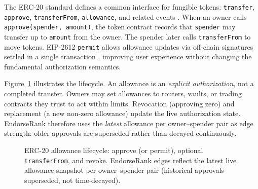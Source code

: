 
The ERC-20 standard defines a common interface for fungible tokens: \texttt{transfer}, \texttt{approve}, \texttt{transferFrom}, \texttt{allowance}, and related events . When an owner calls \texttt{approve(spender, amount)}, the token contract records that \texttt{spender} may transfer up to \texttt{amount} from the owner. The spender later calls \texttt{transferFrom} to move tokens. EIP-2612 \texttt{permit} allows allowance updates via off-chain signatures settled in a single transaction , improving user experience without changing the fundamental authorization semantics.

Figure~\ref{fig:allowance-sequence} illustrates the lifecycle. An allowance is an \emph{explicit authorization}, not a completed transfer. Owners may set allowances to routers, vaults, or trading contracts they trust to act within limits. Revocation (approving zero) and replacement (a new non-zero allowance) update the live authorization state. EndorseRank therefore uses the \emph{latest} allowance per owner--spender pair as edge strength: older approvals are superseded rather than decayed continuously.

\begin{figure}[htbp]
\centering
{}
\caption{ERC-20 allowance lifecycle: approve (or permit), optional \texttt{transferFrom}, and revoke. EndorseRank edges reflect the latest live allowance snapshot per owner--spender pair (historical approvals superseded, not time-decayed).}
\label{fig:allowance-sequence}
\end{figure}

